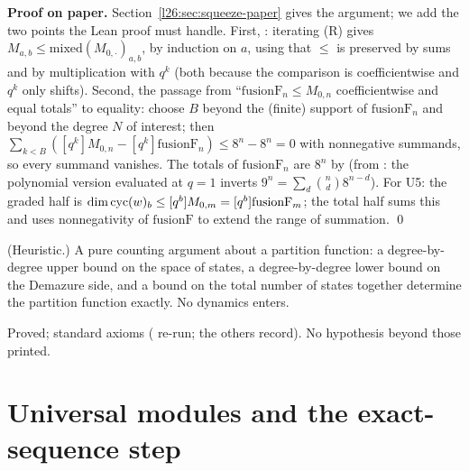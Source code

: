 \textbf{Proof on paper.} Section~\ref{l26:sec:squeeze-paper} gives the argument; we add the two points the Lean proof
must handle. First, : iterating (R) gives $M_{a,b}\le\mathrm{mixed}(M_{0,\cdot})_{a,b}$, by induction on
$a$, using that $\le$ is preserved by sums and by multiplication with $q^k$ (both because the comparison is
coefficientwise and $q^k$ only shifts). Second, the passage from ``$\mathrm{fusionF}_n\le M_{0,n}$ coefficientwise and
equal totals'' to equality: choose $B$ beyond the (finite) support of $\mathrm{fusionF}_n$ and beyond the degree $N$ of
interest; then $\sum_{k<B}([q^k]M_{0,n}-[q^k]\mathrm{fusionF}_n)\le8^n-8^n=0$ with nonnegative summands, so every
summand vanishes. The totals of $\mathrm{fusionF}_n$ are $8^n$ by  (from :
the polynomial version evaluated at $q=1$ inverts $9^n=\sum_d\binom nd8^{n-d}$). For U5: the graded half is
$\dim\operatorname{cyc}(w)_b\le[q^b]M_{0,m}=[q^b]\mathrm{fusionF}_m$; the total half sums this and uses nonnegativity of
$\mathrm{fusionF}$ to extend the range of summation. \qed

\begin{physics}
(Heuristic.) A pure counting argument about a partition function: a degree-by-degree upper bound on the space of
states, a degree-by-degree lower bound on the Demazure side, and a bound on the total number of states together determine the
partition function exactly. No dynamics enters.
\end{physics}

\begin{status}
Proved; standard axioms ( re-run; the others record). No hypothesis beyond those printed.
\end{status}

\section{Universal modules and the exact-sequence step}\label{l26:sec:univ}

